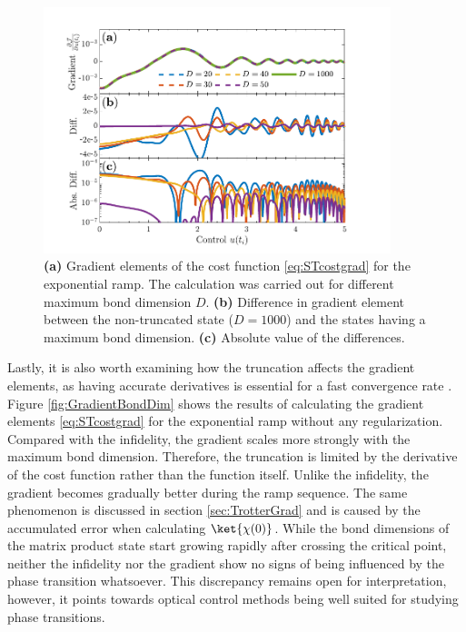 \begin{figure}[h!]
    \centering
    \includegraphics[width=0.9\textwidth]{Figures/L20/GradientTruncation.pdf}
    \caption{ \textbf{(a)} Gradient elements of the cost function \ref{eq:STcostgrad} for the exponential ramp. The calculation was carried out for different maximum bond dimension $D$. \textbf{(b)} Difference in gradient element between the non-truncated state ($D = 1000$) and the states having a maximum bond dimension. \textbf{(c)} Absolute value of the differences. }
    \label{fig:GradientTruncation}
\end{figure}
Lastly, it is also worth examining how the truncation affects the gradient elements, as having accurate derivatives is essential for a fast convergence rate \cite{deFouquieres2011}. Figure \ref{fig:GradientBondDim} shows the results of calculating the gradient elements \ref{eq:STcostgrad} for the exponential ramp without any regularization. Compared with the infidelity, the gradient scales more strongly with the maximum bond dimension. Therefore, the truncation is limited by the derivative of the cost function rather than the function itself. Unlike the infidelity, the gradient becomes gradually better during the ramp sequence. The same phenomenon is discussed in section \ref{sec:TrotterGrad} and is caused by the accumulated error when calculating $\ket{\chi (0)}$. 
While the bond dimensions of the matrix product state start growing rapidly after crossing the critical point, neither the infidelity nor the gradient show no signs of being influenced by the phase transition whatsoever. This discrepancy remains open for interpretation, however, it points towards optical control methods being well suited for studying phase transitions. 